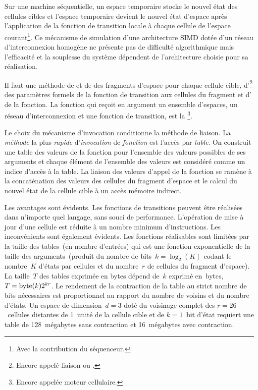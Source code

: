 Sur une machine séquentielle, un espace temporaire stocke le nouvel
état des cellules cibles et l'espace temporaire devient le nouvel état
d'espace après l'application de la fonction de transition locale à
chaque cellule de l'espace courant\footnote{%
  Avec la contribution du séquenceur.}. %
Ce mécanisme de simulation d'une architecture SIMD dotée d'un réseau
d'interconnexion homogène ne présente pas de difficulté algorithmique
mais l'efficacité et la souplesse du système dépendent de
l'architecture choisie pour sa réalisation. %

Il faut une méthode de  et de 
des fragments d'espace pour chaque cellule cible,
d'\footnote{%
  Encore appelé liaison ou .} %
des paramètres formels de la fonction de transition aux cellules du
fragment et d' de la fonction. %
La fonction qui reçoit en argument un ensemble d'espaces, un réseau
d'interconnexion et une fonction de transition, est la
\footnote{%
  Encore appelée moteur cellulaire.}. %

Le choix du mécanisme d'invocation conditionne la méthode de liaison. %
La \emph{méthode} la plus \emph{rapide} d'\emph{invocation} de
\emph{fonction} est l'accès par \emph{table}. %
On construit une table des valeurs de la fonction pour l'ensemble des
valeurs possibles de ses arguments et chaque élément de l'ensemble des
valeurs est considéré comme un indice d'accès à la table. %
La liaison des valeurs d'appel de la fonction se ramène à la
concaténation des valeurs des cellules du fragment d'espace et le
calcul du nouvel état de la cellule cible à un accès mémoire
indirect. %

Les avantages sont évidents. %
Les fonctions de transitions peuvent être réalisées dans n'importe
quel langage, sans souci de performance. %
L'opération de mise à jour d'une cellule est réduite à un nombre
minimum d'instructions. %
Les inconvénients sont également évidents. %
Les fonctions réalisables sont limitées par la taille des tables~(en
nombre d'entrées) qui est une fonction exponentielle de la taille des
arguments~(produit du nombre de bits~$k = \log_{2}(K)$ codant le
nombre~$K$ d'états par cellules et du nombre~$r$ de cellules du
fragment d'espace). %
La taille~$T$ des tables exprimée en bytes dépend de~$k$ exprimé
en~bytes, $T = \operatorname{byte}(k) 2^{kr}$. %
Le rendement de la contraction de la table au strict nombre de bits
nécessaires est proportionnel au rapport du nombre de voisins et du
nombre d'états. %
Un espace de dimension~$d = 3$ doté du voisinage complet %
des $r = 26$~cellules distantes de 1~unité de la cellule cible
 et de $k = 1$~bit d'état requiert
une table de 128~mégabytes sans contraction et 16~mégabytes avec
contraction. %

